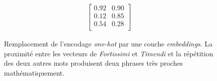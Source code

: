 \begin{figure}[h]
\begin{minipage}{.32\linewidth}
\begin{equation*}
\begin{matrix}
            \begin{bmatrix}
            0.92 & 0.90 \\
            0.12 & 0.85 \\ 
            0.54 & 0.28 \\ 
            \end{bmatrix}
            
            \end{matrix}
        \end{equation*}
    \end{minipage}
    \caption{Remplacement de l'encodage \textit{one-hot} par une couche \textit{embeddings}. La proximité entre les vecteurs de \textit{Fortissimi} et \textit{Timendi} et la répétition des deux autres mots produisent deux phrases très proches mathématiquement.}
    \label{figure:deep-learning:embeddings-encoding}
\end{figure}